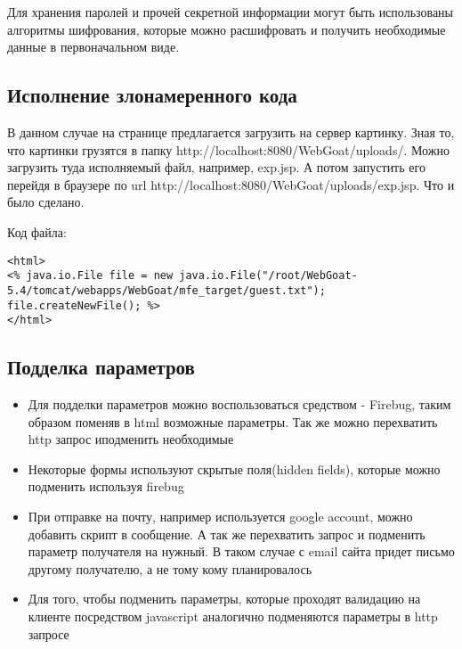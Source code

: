 \documentclass[11pt, a4paper]{article}		%
\begin{document}
Для хранения паролей и прочей секретной информации могут быть использованы алгоритмы шифрования, которые можно расшифровать и получить необходимые данные в первоначальном виде.



\subsection{Исполнение злонамеренного кода}

В данном случае на странице предлагается загрузить на сервер картинку. Зная то, что картинки грузятся в папку  http://localhost:8080/WebGoat/uploads/. Можно загрузить туда исполняемый файл, например, exp.jsp. А потом запустить его перейдя в браузере по url http://localhost:8080/WebGoat/uploads/exp.jsp. Что и было сделано.

Код файла: 

\begin{verbatim}
<html>
<% java.io.File file = new java.io.File("/root/WebGoat-5.4/tomcat/webapps/WebGoat/mfe_target/guest.txt");
file.createNewFile(); %>
</html>
\end{verbatim}



\subsection{Подделка параметров}

\begin{itemize}

\item Для подделки параметров можно воспользоваться средством - Firebug, таким образом поменяв в html возможные параметры. Так же можно перехватить http запрос иподменить необходимые

\item Некоторые формы используют скрытые поля(hidden fields), которые можно подменить используя firebug

\item При отправке на почту, например используется google account, можно добавить скрипт в сообщение. А так же перехватить запрос и подменить параметр получателя на нужный. В таком случае с email сайта придет письмо другому получателю, а не тому кому планировалось

\item Для того, чтобы подменить параметры, которые проходят валидацию на клиенте посредством javascript аналогично подменяются параметры в http запросе

\end{itemize}
\end{document}
